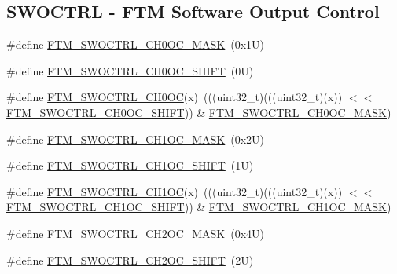 \subsection*{S\+W\+O\+C\+T\+RL -\/ F\+TM Software Output Control}
\begin{DoxyCompactItemize}
\item 
\#define \mbox{\hyperlink{group___f_t_m___register___masks_ga1d6ba2b311aaea0d8857a2eff1a79f9b}{F\+T\+M\+\_\+\+S\+W\+O\+C\+T\+R\+L\+\_\+\+C\+H0\+O\+C\+\_\+\+M\+A\+SK}}~(0x1\+U)
\item 
\#define \mbox{\hyperlink{group___f_t_m___register___masks_ga8a9c262029f5302d089e536c8c44b499}{F\+T\+M\+\_\+\+S\+W\+O\+C\+T\+R\+L\+\_\+\+C\+H0\+O\+C\+\_\+\+S\+H\+I\+FT}}~(0\+U)
\item 
\#define \mbox{\hyperlink{group___f_t_m___register___masks_ga0ca08d761be3c09177764f75a1b7d898}{F\+T\+M\+\_\+\+S\+W\+O\+C\+T\+R\+L\+\_\+\+C\+H0\+OC}}(x)~(((uint32\+\_\+t)(((uint32\+\_\+t)(x)) $<$$<$ \mbox{\hyperlink{group___f_t_m___register___masks_ga8a9c262029f5302d089e536c8c44b499}{F\+T\+M\+\_\+\+S\+W\+O\+C\+T\+R\+L\+\_\+\+C\+H0\+O\+C\+\_\+\+S\+H\+I\+FT}})) \& \mbox{\hyperlink{group___f_t_m___register___masks_ga1d6ba2b311aaea0d8857a2eff1a79f9b}{F\+T\+M\+\_\+\+S\+W\+O\+C\+T\+R\+L\+\_\+\+C\+H0\+O\+C\+\_\+\+M\+A\+SK}})
\item 
\#define \mbox{\hyperlink{group___f_t_m___register___masks_gab033c2350b9eb73407eea7d5be5902bc}{F\+T\+M\+\_\+\+S\+W\+O\+C\+T\+R\+L\+\_\+\+C\+H1\+O\+C\+\_\+\+M\+A\+SK}}~(0x2\+U)
\item 
\#define \mbox{\hyperlink{group___f_t_m___register___masks_ga91d92f8443196bd3f816110707c70355}{F\+T\+M\+\_\+\+S\+W\+O\+C\+T\+R\+L\+\_\+\+C\+H1\+O\+C\+\_\+\+S\+H\+I\+FT}}~(1\+U)
\item 
\#define \mbox{\hyperlink{group___f_t_m___register___masks_ga174e069cd4a4719cccab79a58e0fe97c}{F\+T\+M\+\_\+\+S\+W\+O\+C\+T\+R\+L\+\_\+\+C\+H1\+OC}}(x)~(((uint32\+\_\+t)(((uint32\+\_\+t)(x)) $<$$<$ \mbox{\hyperlink{group___f_t_m___register___masks_ga91d92f8443196bd3f816110707c70355}{F\+T\+M\+\_\+\+S\+W\+O\+C\+T\+R\+L\+\_\+\+C\+H1\+O\+C\+\_\+\+S\+H\+I\+FT}})) \& \mbox{\hyperlink{group___f_t_m___register___masks_gab033c2350b9eb73407eea7d5be5902bc}{F\+T\+M\+\_\+\+S\+W\+O\+C\+T\+R\+L\+\_\+\+C\+H1\+O\+C\+\_\+\+M\+A\+SK}})
\item 
\#define \mbox{\hyperlink{group___f_t_m___register___masks_gafb399bfe91227e3c1ef409df4f3296b9}{F\+T\+M\+\_\+\+S\+W\+O\+C\+T\+R\+L\+\_\+\+C\+H2\+O\+C\+\_\+\+M\+A\+SK}}~(0x4\+U)
\item 
\#define \mbox{\hyperlink{group___f_t_m___register___masks_gabafc3c919320572e1474319804e13958}{F\+T\+M\+\_\+\+S\+W\+O\+C\+T\+R\+L\+\_\+\+C\+H2\+O\+C\+\_\+\+S\+H\+I\+FT}}~(2\+U)

\end{DoxyCompactItemize}
